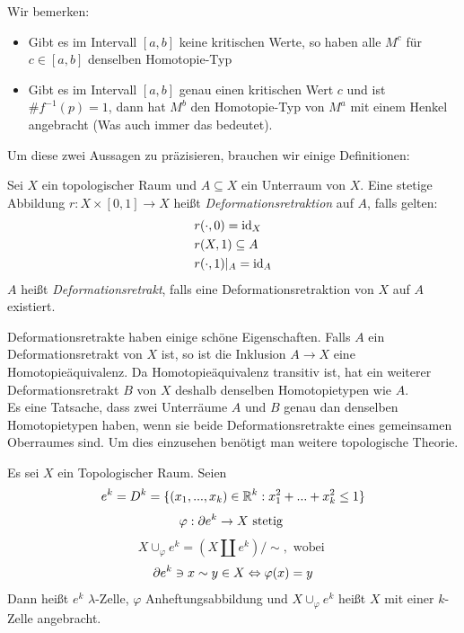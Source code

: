 \documentclass[a4paper,11pt]{article}
\begin{document}
Wir bemerken: 
\begin{itemize}
    \item Gibt es im Intervall $[a, b]$ keine kritischen Werte, so haben alle
        $M^c$ für $c \in [a, b]$ denselben Homotopie-Typ
    \item Gibt es im Intervall $[a, b]$ genau einen kritischen Wert $c$ und ist
        $ \#f^{-1}(p) = 1$, dann hat $M^b$ den Homotopie-Typ von $M^a$ mit einem 
        Henkel angebracht (Was auch immer das bedeutet).
\end{itemize}

Um diese zwei Aussagen zu präzisieren, brauchen wir einige Definitionen:

\begin{definition}[Deformationsretrakt]
    Sei $X$ ein topologischer Raum und $A \subseteq X$ ein Unterraum von $X$.
    Eine stetige Abbildung $r: X \times [0, 1] \rightarrow X$ heißt 
    \textit{Deformationsretraktion} auf $A$, falls gelten:
    \begin{align*}
        & r(\cdot, 0) = { \operatorname{id} }_X \\
        & r(X, 1) \subseteq A \\
        & r(\cdot, 1)|_A = { \operatorname{id} }_A \\
    \end{align*}
    $A$ heißt \textit{Deformationsretrakt}, falls eine Deformationsretraktion
    von $X$ auf $A$ existiert.
\end{definition}

Deformationsretrakte haben einige schöne Eigenschaften. Falls $A$ ein
Deformationsretrakt von $X$ ist, so ist die Inklusion $A \rightarrow X$ eine
Homotopieäquivalenz. Da Homotopieäquivalenz transitiv ist, hat ein weiterer
Deformationsretrakt $B$ von $X$ deshalb denselben Homotopietypen wie $A$. \\
Es eine Tatsache, dass zwei Unterräume $A$ und $B$ genau dan denselben 
Homotopietypen haben, wenn sie beide Deformationsretrakte eines gemeinsamen 
Oberraumes sind. Um dies einzusehen benötigt man weitere topologische 
Theorie.

\begin{definition}
    Es sei $X$ ein Topologischer Raum. Seien
    \[ e^k = D^k = \{(x_1, ..., x_k) \in { \mathbb R }^k: x_1^2 + ... + x_k^2 \leq 1\} \]
    \[ \varphi: { \partial } e^k \rightarrow X \text{ stetig } \]
    \[ X \cup_{\varphi} e^k = (X \amalg e^k) / \sim, \text{ wobei } \]
    \[ { \partial } e^k \ni x \sim y \in X \Leftrightarrow \varphi(x) = y \]
    Dann heißt $e^k$ $\lambda$-Zelle, $\varphi$ Anheftungsabbildung 
    und $X \cup_{\varphi} e^k$ heißt $X$ mit einer $k$-Zelle 
    angebracht.
\end{definition}
\end{document}
